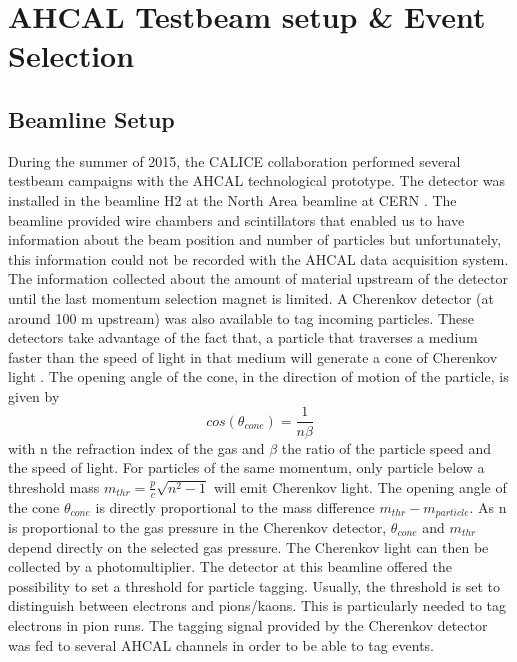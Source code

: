 \chapter{AHCAL Testbeam setup \& Event Selection}
\label{sec:EvtSelection}

\section{Beamline Setup}
\label{sec:beamline}

During the summer of 2015, the CALICE collaboration performed several testbeam campaigns with the AHCAL technological prototype. The detector was installed in the beamline H2 at the North Area beamline at CERN \cite{H2Beamline}. The beamline provided wire chambers and scintillators that enabled us to have information about the beam position and number of particles but unfortunately, this information could not be recorded with the AHCAL data acquisition system. The information collected about the amount of material upstream of the detector until the last momentum selection magnet is limited. A Cherenkov detector (at around 100 m upstream) was also available to tag incoming particles. These detectors take advantage of the fact that, a particle that traverses a medium faster than the speed of light in that medium will generate a cone of Cherenkov light \cite{GOVORKOV20059}. The opening angle of the cone, in the direction of motion of the particle, is given by
\begin{equation}
	cos(\theta_{cone}) = \frac{1}{n\beta}
\end{equation}
with n the refraction index of the gas and $\beta$ the ratio of the particle speed and the speed of light. For particles of the same momentum, only particle below a threshold mass $m_{thr} = \frac{p}{c}\sqrt{n^2 - 1}$ will emit Cherenkov light. The opening angle of the cone $\theta_{cone}$ is directly proportional to the mass difference $m_{thr} - m_{particle}$. As n is proportional to the gas pressure in the Cherenkov detector, $\theta_{cone}$ and $m_{thr}$ depend directly on the selected gas pressure. The Cherenkov light can then be collected by a photomultiplier. The detector at this beamline offered the possibility to set a threshold for particle tagging. Usually, the threshold is set to distinguish between electrons and pions/kaons. This is particularly needed to tag electrons in pion runs. The tagging signal provided by the Cherenkov detector was fed to several AHCAL channels in order to be able to tag events.\\

